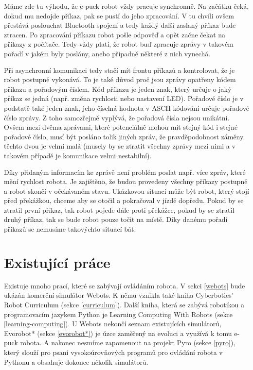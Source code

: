 \documentclass[12pt,notitlepage]{report}
\begin{document}
    Máme zde tu výhodu, že e-puck robot vždy pracuje synchronně. Na začátku
    čeká, dokud mu nedojde příkaz, pak se pustí do jeho zpracování. V tu chvíli
    ovšem přestává poslouchat Bluetooth spojení a tedy každý další zaslaný
    příkaz bude ztracen. Po zpracování příkazu robot pošle odpověď a opět začne
    čekat na příkazy z počítače. Tedy vždy platí, že robot buď zpracuje zprávy
    v takovém pořadí v jakém byly poslány, anebo případně některé z nich
    vynechá.

    Při asynchronní komunikaci tedy stačí mít frontu příkazů a kontrolovat, že
    je robot postupně vykonává. To je také důvod proč jsou zprávy opatřeny
    kódem příkazu a pořadovým číslem. Kód příkazu je jeden znak, který určuje o
    jaký příkaz se jedná (např. změna rychlosti nebo nastavení LED). Pořadové
    číslo je v podstatě také jeden znak, jeho číselná hodnota v ASCII kódování
    určuje pořadové číslo zprávy. Z toho samozřejmě vyplývá, že pořadová čísla
    nejsou unikátní. Ovšem mezi dvěma zprávami, které potenciálně mohou mít
    stejný kód i stejné pořadové číslo, musí být posláno tolik jiných zpráv, že
    pravděpodobnost záměny těchto dvou je velmi malá (musely by se ztratit
    všechny zprávy mezi nimi a v takovém případě je komunikace velmi
    nestabilní).

    Díky přidaným informacím ke zprávě není problém poslat např. více zpráv,
    které mění rychlost robota. Je zajištěno, že budou provedeny všechny
    příkazy postupně a robot skončí v očekávaném stavu. Ukázkovou situací může
    být robot, který stojí před překážkou, chceme aby se otočil a pokračoval v
    jízdě dopředu. Pokud by se ztratil první příkaz, tak robot pojede dále
    proti překážce, pokud by se ztratil druhý příkaz, tak se bude robot pouze
    točit na místě. Díky danému pořadí příkazů se nemusíme takovýchto situací
    bát.

    \section{Existující práce}
    \label{existujici prace}

        Existuje mnoho prací, které se zabývají ovládáním robota. V sekci
        \ref{webots} bude ukázán komerční simulátor Webots. K němu vznikla také
        kniha Cyberbotics' Robot Curriculum (sekce \ref{curriculum}). Další
        kniha, která se zabývá robotikou a programovacím jazykem Python je
        Learning Computing With Robots (sekce \ref{learning-computing}). U
        Webots nekončí seznam existujících simulátorů, Evorobot* (sekce
        \ref{evorobot*}) je úzce zaměřený na evoluci a využívá k tomu e-puck
        robota. A nakonec nesmíme zapomenout na projekt Pyro (sekce
        \ref{pyro}), který slouží pro psaní vysokoúrovňových programů pro
        ovládání robota v Pythonu a obsahuje dokonce několik simulátorů.
\end{document}
